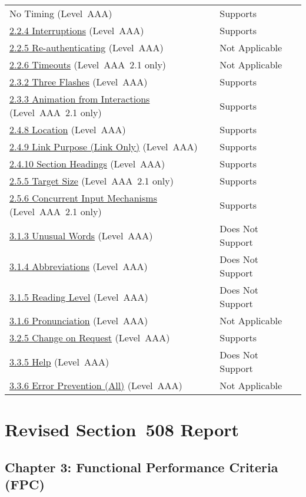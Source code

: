 \documentclass{report}
\begin{document}
\begin{longtable}{p{}<{\RaggedRight}p{}<{\RaggedRight}p{}<{\RaggedRight}}
{  No Timing} (Level~AAA) & Supports\\
  \href{http://www.w3.org/TR/WCAG20/#time-limits-postponed}{2.2.4
  Interruptions} (Level~AAA) & Supports\\
  \href{http://www.w3.org/TR/WCAG20/#time-limits-server-timeout}{2.2.5
  Re-authenticating} (Level~AAA) & Not Applicable \\
  \href{https://www.w3.org/TR/WCAG21/#timeouts}{2.2.6 Timeouts}
  (Level~AAA~2.1 only) & Not Applicable\\
  \href{http://www.w3.org/TR/WCAG20/#seizure-three-times}{2.3.2 Three
  Flashes} (Level~AAA) & Supports\\
  \href{https://www.w3.org/TR/WCAG21/#animation-from-interactions}{2.3.3
  Animation from Interactions} (Level~AAA~2.1 only) & Supports\\
  \href{http://www.w3.org/TR/WCAG20/#navigation-mechanisms-location}{2.4.8
  Location} (Level~AAA) & Supports\\
  \href{http://www.w3.org/TR/WCAG20/#navigation-mechanisms-link}{2.4.9
  Link Purpose (Link Only)} (Level~AAA) & Supports\\
  \href{http://www.w3.org/TR/WCAG20/#navigation-mechanisms-headings}{2.4.10
  Section Headings} (Level~AAA) & Supports\\
  \href{https://www.w3.org/TR/WCAG21/#target-size}{2.5.5 Target Size}
  (Level~AAA~2.1 only) & Supports\\
  \href{https://www.w3.org/TR/WCAG21/#concurrent-input-mechanisms}{2.5.6
  Concurrent Input Mechanisms} (Level~AAA~2.1 only) & Supports\\
  \href{http://www.w3.org/TR/WCAG20/#meaning-idioms}{3.1.3 Unusual
  Words} (Level~AAA) & Does Not Support\\
  \href{http://www.w3.org/TR/WCAG20/#meaning-located}{3.1.4
  Abbreviations} (Level~AAA) & Does Not Support\\
  \href{http://www.w3.org/TR/WCAG20/#meaning-supplements}{3.1.5
  Reading Level} (Level~AAA) & Does Not Support\\
  \href{http://www.w3.org/TR/WCAG20/#meaning-pronunciation}{3.1.6
  Pronunciation} (Level~AAA) & Not Applicable\\
  \href{http://www.w3.org/TR/WCAG20/#consistent-behavior-no-extreme-changes-context}{3.2.5
  Change on Request} (Level~AAA) & Supports \\
  \href{http://www.w3.org/TR/WCAG20/#minimize-error-context-help}{3.3.5
  Help} (Level~AAA) & Does Not Support\\
  \href{http://www.w3.org/TR/WCAG20/#minimize-error-reversible-all}{3.3.6
  Error Prevention (All)} (Level~AAA) & Not Applicable\\
\end{longtable}

\clearpage
\section{Revised Section~508 Report}
\label{sec:sec508}

\subsection{Chapter 3: Functional Performance Criteria (FPC)}
\label{sec:508-3}
\end{document}
